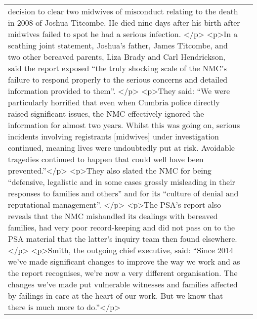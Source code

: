 \documentclass[]{article}
\begin{document}
\begin{table}[!h]
{\begin{tabular}[t]{ll}
decision to clear two midwives of misconduct relating to the death in 2008 of Joshua Titcombe. He died nine days after his birth after midwives failed to spot he had a serious infection. </p> <p>In a scathing joint statement, Joshua’s father, James Titcombe, and two other bereaved parents, Liza Brady and Carl Hendrickson, said the report exposed “the truly shocking scale of the NMC’s failure to respond properly to the serious concerns and detailed information provided to them”. </p> <p>They said: “We were particularly horrified that even when Cumbria police directly raised significant issues, the NMC effectively ignored the information for almost two years. Whilst this was going on, serious incidents involving registrants [midwives] under investigation continued, meaning lives were undoubtedly put at risk. Avoidable tragedies continued to happen that could well have been prevented.”</p> <p>They also slated the NMC for being “defensive, legalistic and in some cases grossly misleading in their responses to families and others” and for its “culture of denial and reputational management”. </p> <p>The PSA’s report also reveals that the NMC mishandled its dealings with bereaved families, had very poor record-keeping and did not pass on to the PSA material that the latter’s inquiry team then found elsewhere. </p> <p>Smith, the outgoing chief executive, said: “Since 2014 we’ve made significant changes to improve the way we work and as the report recognises, we’re now a very different organisation. The changes we’ve made put vulnerable witnesses and families affected by failings in care at the heart of our work. But we know that there is much more to do.”</p>\\

\end{tabular}}
\end{table}
\end{document}

